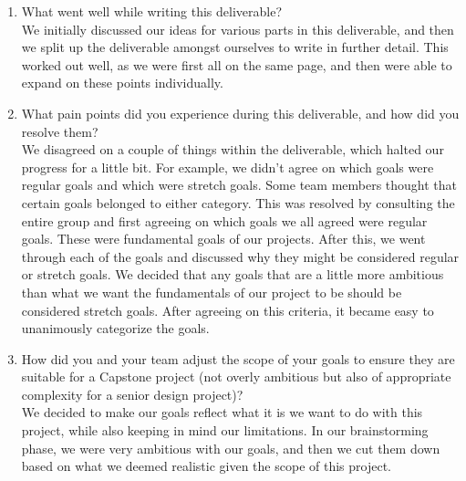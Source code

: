 \documentclass{article}
\begin{document}
\begin{enumerate}
    \item What went well while writing this deliverable? \\
    
    We initially discussed our ideas for various parts in this deliverable, and then we split up the deliverable amongst ourselves to write in further detail. This worked out well, as we were first all on the same page, and then were able to expand on these points individually.
    
    \item What pain points did you experience during this deliverable, and how
    did you resolve them? \\
    
    We disagreed on a couple of things within the deliverable, which halted our progress for a little bit. For example, we didn’t agree on which goals were regular goals and which were stretch goals. Some team members thought that certain goals belonged to either category. This was resolved by consulting the entire group and first agreeing on which goals we all agreed were regular goals. These were fundamental goals of our projects. After this, we went through each of the goals and discussed why they might be considered regular or stretch goals. We decided that any goals that are a little more ambitious than what we want the fundamentals of our project to be should be considered stretch goals. After agreeing on this criteria, it became easy to unanimously categorize the goals.
    
    \item How did you and your team adjust the scope of your goals to ensure
    they are suitable for a Capstone project (not overly ambitious but also of
    appropriate complexity for a senior design project)? \\
    
    We decided to make our goals reflect what it is we want to do with this project, while also keeping in mind our limitations. In our brainstorming phase, we were very ambitious with our goals, and then we cut them down based on what we deemed realistic given the scope of this project.
    
\end{enumerate}  
\end{document}

